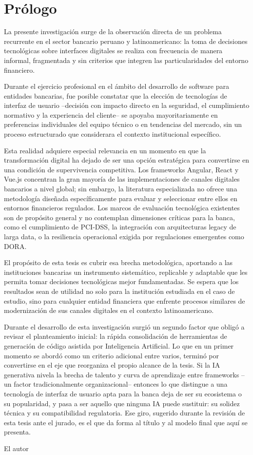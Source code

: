 \chapter*{Prólogo}

La presente investigación surge de la observación directa de un problema
recurrente en el sector bancario peruano y latinoamericano: la toma de decisiones
tecnológicas sobre interfaces digitales se realiza con frecuencia de manera
informal, fragmentada y sin criterios que integren las particularidades del entorno
financiero.

Durante el ejercicio profesional en el ámbito del desarrollo de software para
entidades bancarias, fue posible constatar que la elección de tecnologías
de interfaz de usuario --decisión con impacto directo en la seguridad, el cumplimiento
normativo y la experiencia del cliente-- se apoyaba mayoritariamente en
preferencias individuales del equipo técnico o en tendencias del mercado, sin un
proceso estructurado que considerara el contexto institucional específico.

Esta realidad adquiere especial relevancia en un momento en que la
transformación digital ha dejado de ser una opción estratégica para convertirse en
una condición de supervivencia competitiva. Los frameworks Angular, React y
Vue.js concentran la gran mayoría de las implementaciones de canales digitales
bancarios a nivel global; sin embargo, la literatura especializada no ofrece una
metodología diseñada específicamente para evaluar y seleccionar entre ellos en
entornos financieros regulados. Los marcos de evaluación tecnológica existentes
son de propósito general y no contemplan dimensiones críticas para la banca,
como el cumplimiento de PCI-DSS, la integración con arquitecturas legacy de
larga data, o la resiliencia operacional exigida por regulaciones emergentes como
DORA.

El propósito de esta tesis es cubrir esa brecha metodológica, aportando a las
instituciones bancarias un instrumento sistemático, replicable y adaptable que les
permita tomar decisiones tecnológicas mejor fundamentadas. Se espera que los
resultados sean de utilidad no solo para la institución estudiada en el caso de
estudio, sino para cualquier entidad financiera que enfrente procesos similares de
modernización de sus canales digitales en el contexto latinoamericano.

Durante el desarrollo de esta investigación surgió un segundo factor que
obligó a revisar el planteamiento inicial: la rápida consolidación de
herramientas de generación de código asistida por Inteligencia Artificial.
Lo que en un primer momento se abordó como un criterio adicional entre
varios, terminó por convertirse en el eje que reorganiza el propio alcance
de la tesis. Si la IA generativa nivela la brecha de talento y curva de
aprendizaje entre frameworks --un factor tradicionalmente organizacional--
entonces lo que distingue a una tecnología de interfaz de usuario apta para
la banca deja de ser su ecosistema o su popularidad, y pasa a ser aquello
que ninguna IA puede sustituir: su solidez técnica y su compatibilidad
regulatoria. Ese giro, sugerido durante la revisión de esta tesis ante el
jurado, es el que da forma al título y al modelo final que aquí se
presenta.

\vspace{1cm}
\begin{flushright}
El autor
\end{flushright}
